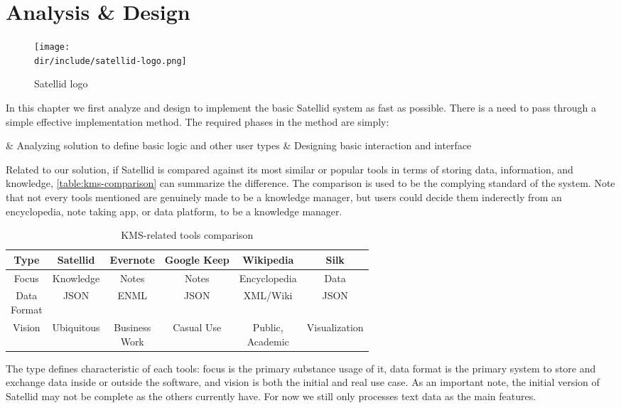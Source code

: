 \chapter{Analysis \& Design}
\label{chap:analysis-design}

\begin{figure}[ht]
  \centering
  \texttt{[image: \\dir/include/satellid-logo.png]}
  \caption{Satellid logo}
  \label{fig:satellid-logo}
\end{figure}

In this chapter we first analyze and design to implement the basic Satellid system as fast as possible.
There is a need to pass through a simple effective implementation method.
The required phases in the method are simply:

\begin{easylist}
& Analyzing solution to define basic logic and other user types
& Designing basic interaction and interface
\end{easylist}


Related to our solution, if Satellid is compared against its most similar or popular tools in terms of storing data, information, and knowledge, \autoref{table:kms-comparison} can summarize the difference.
The comparison is used to be the complying standard of the system.
Note that not every tools mentioned are genuinely made to be a knowledge manager, but users could decide them inderectly from an encyclopedia, note taking app, or data platform, to be a knowledge manager.

\begin{table}[h!]
\centering
\begin{tabular}{ |c||c|c|c|c|c| }
\hline
Type         & Satellid   & Evernote      & Google Keep & Wikipedia    & Silk \\ \hline
\hline
Focus        & Knowledge  & Notes         & Notes       & Encyclopedia & Data \\ \hline
\shortstack{Data\\Format} & JSON       & ENML          & JSON        & XML/Wiki     & JSON \\ \hline
Vision       & Ubiquitous & \shortstack{Business\\Work} & Casual Use  & \shortstack{Public,\\Academic} & Visualization \\
\hline
\end{tabular}
\caption{KMS-related tools comparison}
\label{table:kms-comparison}
\end{table}

The type defines characteristic of each tools: focus is the primary substance usage of it, data format is the primary system to store and exchange data inside or outside the software, and vision is both the initial and real use case.
As an important note, the initial version of Satellid may not be complete as the others currently have.
For now we still only processes text data as the main features.
